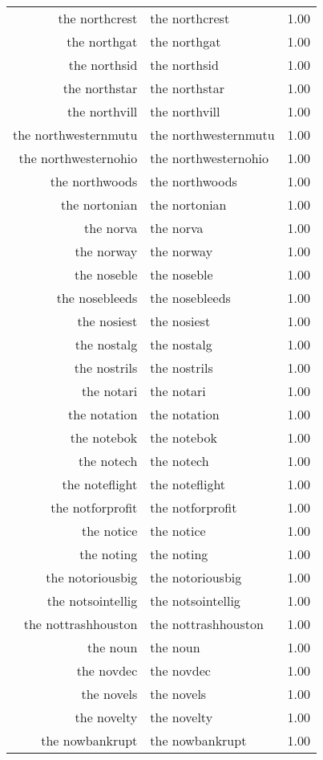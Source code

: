 \begin{table}[ht]
\begin{tabular}{rlr}
  the northcrest & the northcrest & 1.00 \\ 
  the northgat & the northgat & 1.00 \\ 
  the northsid & the northsid & 1.00 \\ 
  the northstar & the northstar & 1.00 \\ 
  the northvill & the northvill & 1.00 \\ 
  the northwesternmutu & the northwesternmutu & 1.00 \\ 
  the northwesternohio & the northwesternohio & 1.00 \\ 
  the northwoods & the northwoods & 1.00 \\ 
  the nortonian & the nortonian & 1.00 \\ 
  the norva & the norva & 1.00 \\ 
  the norway & the norway & 1.00 \\ 
  the noseble & the noseble & 1.00 \\ 
  the nosebleeds & the nosebleeds & 1.00 \\ 
  the nosiest & the nosiest & 1.00 \\ 
  the nostalg & the nostalg & 1.00 \\ 
  the nostrils & the nostrils & 1.00 \\ 
  the notari & the notari & 1.00 \\ 
  the notation & the notation & 1.00 \\ 
  the notebok & the notebok & 1.00 \\ 
  the notech & the notech & 1.00 \\ 
  the noteflight & the noteflight & 1.00 \\ 
  the notforprofit & the notforprofit & 1.00 \\ 
  the notice & the notice & 1.00 \\ 
  the noting & the noting & 1.00 \\ 
  the notoriousbig & the notoriousbig & 1.00 \\ 
  the notsointellig & the notsointellig & 1.00 \\ 
  the nottrashhouston & the nottrashhouston & 1.00 \\ 
  the noun & the noun & 1.00 \\ 
  the novdec & the novdec & 1.00 \\ 
  the novels & the novels & 1.00 \\ 
  the novelty & the novelty & 1.00 \\ 
  the nowbankrupt & the nowbankrupt & 1.00 \\ 

\end{tabular}
\end{table}
